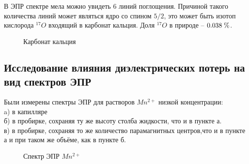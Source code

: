 \documentclass[a4paper,12pt]{article}
\theoremstyle{plain} %
\theoremstyle{definition} %
\theoremstyle{remark} %
\begin{document}
\newpage
\setcounter{page}{13}
В ЭПР спектре мела можно увидеть 6 линий поглощения. Причиной такого количества линий 
может являться ядро со спином $5/2$, это может быть изотоп кислорода $^{17}O$ входящий в карбонат 
кальция. Доля $^{17}O$ в природе -- $0.038 \hspace{1 mm}\%$.

\begin{figure}[h!]
	\caption{Карбонат кальция}
	\label{fig:image}
\end{figure}

\subsection{Исследование влияния диэлектрических потерь на вид спектров ЭПР}

Были измерены спектры ЭПР для растворов $Mn^{2+}$ низкой концентрации:
\\
a) в капилляре
\\б) в пробирке, сохраняя ту же высоту столба жидкости, что и в пункте а.
\\в) в пробирке, сохраняя то же количество парамагнитных центров,что и в пункте а и при таком же объёме, как в пункте б.

\begin{figure}[h!]
	\caption{Спектр ЭПР $Mn^{2+}$}
	\label{fig:image}
\end{figure}
\end{document}
